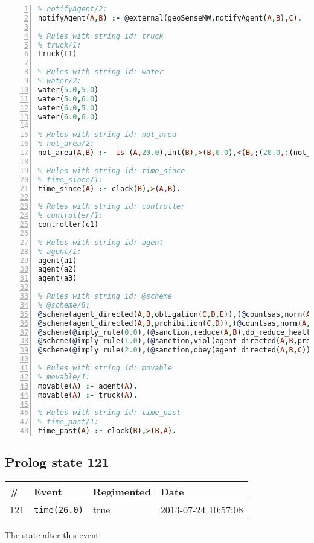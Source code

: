 \documentclass[11pt]{article}\usepackage[utf8]{inputenc}\usepackage{geometry}
\begin{document}
\begin{lstlisting}[language=Prolog, numbers=left]
% Rules with string id: notifyAgent
% notifyAgent/2:
notifyAgent(A,B) :- @external(geoSenseMW,notifyAgent(A,B),C).

% Rules with string id: truck
% truck/1:
truck(t1)

% Rules with string id: water
% water/2:
water(5.0,5.0)
water(5.0,6.0)
water(6.0,5.0)
water(6.0,6.0)

% Rules with string id: not_area
% not_area/2:
not_area(A,B) :-  is (A,20.0),int(B),>(B,0.0),<(B,;(20.0,:(not_area(A,B), is (-(B),20.0)))),int(A),>(A,0.0),<(A,;(20.0,:(area(A,B),-(int(A))))),int(B),>(A,0.0),>(B,0.0),<(A,21.0),<(B,21.0).

% Rules with string id: time_since
% time_since/1:
time_since(A) :- clock(B),>(A,B).

% Rules with string id: controller
% controller/1:
controller(c1)

% Rules with string id: agent
% agent/1:
agent(a1)
agent(a2)
agent(a3)

% Rules with string id: @scheme
% @scheme/8:
@scheme(agent_directed(A,B,obligation(C,D,E)),(@countsas,norm(A,B,F,obligation(C,D,E)),F),false,(listTrue(C)),(time_past(D)),false,[plus(viol(agent_directed(A,B,obligation(C,D,E))))|[]],[plus(obey(agent_directed(A,B,obligation(C,D,E))))|[]])
@scheme(agent_directed(A,B,prohibition(C,D)),(@countsas,norm(A,B,E,prohibition(C,D)),E),(listTrue(C)),false,(false),false,[plus(viol(agent_directed(A,B,prohibition(C,D))))|[]],[plus(obey(agent_directed(A,B,prohibition(C,D))))|[]])
@scheme(@imply_rule(0.0),(@sanction,reduce(A,B),do_reduce_health(A,B),notifyAgent(A,changed(status))),true,false,false,false,[min(reduce(A,B))|[]],[])
@scheme(@imply_rule(1.0),(@sanction,viol(agent_directed(A,B,prohibition(C,D))),do_sanction(D)),true,false,false,false,[min(viol(agent_directed(A,B,prohibition(C,D))))|[]],[])
@scheme(@imply_rule(2.0),(@sanction,obey(agent_directed(A,B,C))),true,false,false,false,[min(obey(agent_directed(A,B,C)))|[]],[])

% Rules with string id: movable
% movable/1:
movable(A) :- agent(A).
movable(A) :- truck(A).

% Rules with string id: time_past
% time_past/1:
time_past(A) :- clock(B),>(B,A).

\end{lstlisting}
\clearpage 
\subsection{Prolog state 121}
\begin{table}[ht]
\centering 
\begin{tabular}{l l l l} 
\textbf{\#} & \textbf{Event} & \textbf{Regimented} & \textbf{Date} \\ [0.5ex] 
\hline
121&\texttt{time(26.0)}&true&2013-07-24 10:57:08\\ [1ex] \hline\end{tabular}
\end{table}
The state after this event:
\end{document}
